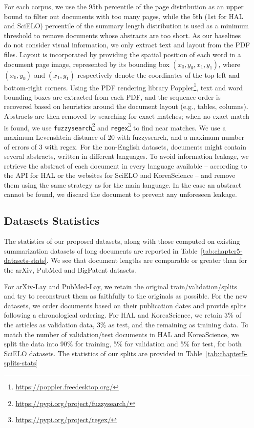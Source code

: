 For each corpus, we use the 95th percentile of the page distribution as an upper bound to filter out documents with too many pages, while the 5th (1st for HAL and SciELO) percentile of the summary length distribution is used as a minimum threshold to remove documents whose abstracts are too short. As our baselines do not consider visual information, we only extract text and layout from the PDF files. Layout is incorporated by providing the spatial position of each word in a document page image, represented by its bounding box $(x_0, y_0, x_1, y_1)$, where $(x_0, y_0)$ and $(x_1, y_1)$ respectively denote the coordinates of the top-left and bottom-right corners. Using the PDF rendering library Poppler\footnote{ \url{https://poppler.freedesktop.org/}}, text and word bounding boxes are extracted from each PDF, and the sequence order is recovered based on heuristics around the document layout (e.g., tables, columns). Abstracts are then removed by searching for exact matches; when no exact match is found, we use \texttt{fuzzysearch}\footnote{ \url{https://pypi.org/project/fuzzysearch/}} and \texttt{regex}\footnote{ \url{https://pypi.org/project/regex/}} to find near matches. We use a maximum Levenshtein distance of 20 with fuzzysearch, and a maximum number of errors of 3 with regex. For the non-English datasets, documents might contain several abstracts, written in different languages. To avoid information leakage, we retrieve the abstract of each document in every language available -- according to the API for HAL or the websites for SciELO and KoreaScience -- and remove them using the same strategy as for the main language. In the case an abstract cannot be found, we discard the document to prevent any unforeseen leakage. 

\subsection{Datasets Statistics}

The statistics of our proposed datasets, along with those computed on existing summarization datasets of long documents \citep{cohan2018discourse, sharma2019bigpatent} are reported in Table~\ref{tab:chapter5-datasets-stats}. We see that document lengths are comparable or greater than for the arXiv, PubMed and BigPatent datasets.  

For arXiv-Lay and PubMed-Lay, we retain the original train/validation/splits and try to reconstruct them as faithfully to the originals as possible. For the new datasets, we order documents based on their publication dates and provide splits following a chronological ordering. For HAL and KoreaScience, we retain 3\% of the articles as validation data, 3\% as test, and the remaining as training data. To match the number of validation/test documents in HAL and KoreaScience, we split the data into 90\% for training, 5\% for validation and 5\% for test, for both SciELO datasets. The statistics of our splits are provided in Table~\ref{tab:chapter5-splits-stats}

